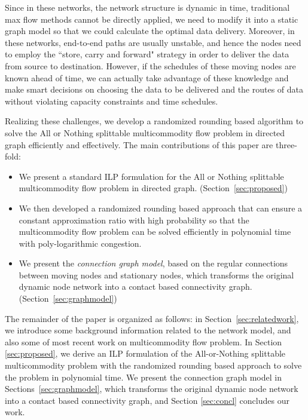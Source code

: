 \documentclass[conference]{IEEEtran}
\begin{document}
Since in these networks, the network structure is dynamic in time, traditional max flow methods cannot be directly applied, we need to modify it into a static graph model so that we could calculate the optimal data delivery. Moreover, in these networks, end-to-end paths are usually unstable, and hence the nodes need to employ the ``store, carry and forward" strategy in order to deliver the data from source to destination. However, if the schedules of these moving nodes are known ahead of time, we can actually take advantage of these knowledge and make smart decisions on choosing the data to be delivered and the routes of data without violating capacity constraints and time schedules.


Realizing these challenges, we develop a randomized rounding based algorithm to solve the All or Nothing splittable multicommodity flow problem in directed graph efficiently and effectively. The main contributions of this paper are three-fold:

\begin{itemize}

\item We present a standard ILP formulation for the All or Nothing splittable multicommodity flow problem in directed graph. (Section~\ref{sec:proposed})

\item We then developed a randomized rounding based approach that can ensure a constant  approximation ratio with high probability so that the multicommodity flow problem can be solved efficiently in polynomial time with poly-logarithmic congestion.

\item We present the {\em connection graph model}, based on the regular connections between moving nodes and stationary nodes, which transforms the original dynamic node network into a contact based connectivity graph. (Section~\ref{sec:graphmodel})

\end{itemize}

The remainder of the paper is organized as follows: in Section~\ref{sec:relatedwork}, we introduce some background information related to the network model, and also some of most recent work on multicommodity flow problem. In Section \ref{sec:proposed}, we derive an ILP formulation of the All-or-Nothing splittable multicommodity problem with the randomized rounding based approach to solve the problem in polynomial time. We present the connection graph model in Sections~\ref{sec:graphmodel}, which transforms the original dynamic node network into a contact based connectivity graph, and Section \ref{sec:concl} concludes our work.
\end{document}
